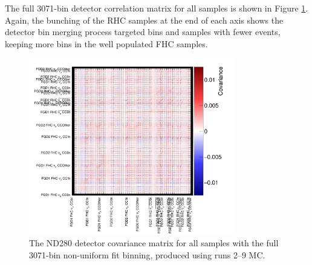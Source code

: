 The full 3071-bin detector correlation matrix for all samples is shown in Figure \ref{fig:detcorrFitAll}. Again, the bunching of the RHC samples at the end of each axis shows the detector bin merging process targeted bins and samples with fewer events, keeping more bins in the well populated FHC samples.

\begin{figure}[!htbp]
\centering
\includegraphics*[width=0.8\textwidth,clip]{figs/detcovFit}
\caption{The ND280 detector covariance matrix for all samples with the full 3071-bin non-uniform fit binning, produced using runs 2--9 MC.}\label{fig:detcorrFitAll}
\end{figure}